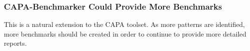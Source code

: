 \subsubsection{CAPA-Benchmarker Could Provide More Benchmarks}
This is a natural extension to the CAPA toolset. As more patterns are identified, more benchmarks
should be created in order to continue to provide more detailed reports.
